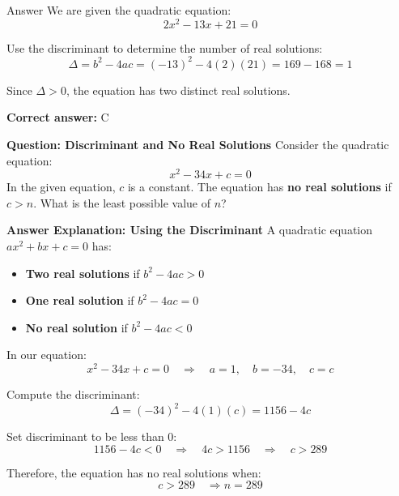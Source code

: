 \documentclass{beamer}
\begin{document}
\begin{frame}{Answer}
We are given the quadratic equation:
\[
2x^2 - 13x + 21 = 0
\]

Use the discriminant to determine the number of real solutions:
\[
\Delta = b^2 - 4ac = (-13)^2 - 4(2)(21) = 169 - 168 = 1
\]

Since $\Delta > 0$, the equation has two distinct real solutions.

\textbf{Correct answer:} C
\end{frame}



\begin{frame}{\textbf{Question: Discriminant and No Real Solutions}}
Consider the quadratic equation:
\[
x^2 - 34x + c = 0
\]
In the given equation, \(c\) is a constant. The equation has \textbf{no real solutions} if \(c > n\).  
What is the least possible value of \(n\)?


\end{frame}


\begin{frame}{\textbf{Answer Explanation: Using the Discriminant}}
\small
A quadratic equation \(ax^2 + bx + c = 0\) has:
\begin{itemize}
    \item \textbf{Two real solutions} if \(b^2 - 4ac > 0\)
    \item \textbf{One real solution} if \(b^2 - 4ac = 0\)
    \item \textbf{No real solution} if \(b^2 - 4ac < 0\)
\end{itemize}

\vspace{0.3cm}
In our equation:
\[
x^2 - 34x + c = 0 \quad \Rightarrow \quad a = 1, \quad b = -34, \quad c = c
\]

Compute the discriminant:
\[
\Delta = (-34)^2 - 4(1)(c) = 1156 - 4c
\]

Set discriminant to be less than 0:
\[
1156 - 4c < 0 \quad \Rightarrow \quad 4c > 1156 \quad \Rightarrow \quad c > 289
\]

Therefore, the equation has no real solutions when:
\[
c > 289 \quad \Rightarrow \boxed{n = 289}
\]
\end{frame}
\end{document}
